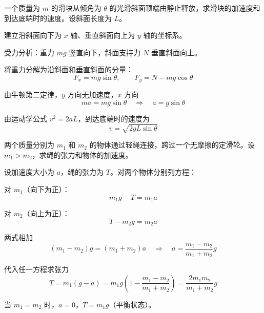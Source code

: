 \begin{example}[斜面上的滑块]
    一个质量为 $m$ 的滑块从倾角为 $\theta$ 的光滑斜面顶端由静止释放，求滑块的加速度和到达底端时的速度。设斜面长度为 $L$。
    \begin{solution}
        建立沿斜面向下为 $x$ 轴、垂直斜面向上为 $y$ 轴的坐标系。
        
        受力分析：重力 $mg$ 竖直向下，斜面支持力 $N$ 垂直斜面向上。
        
        将重力分解为沿斜面和垂直斜面的分量：
        \begin{equation}
            F_x = mg\sin\theta, \qquad F_y = N - mg\cos\theta
        \end{equation}
        
        由牛顿第二定律，$y$ 方向无加速度，$x$ 方向
        \begin{equation}
            ma = mg\sin\theta \quad \Longrightarrow \quad a = g\sin\theta
        \end{equation}
        
        由运动学公式 $v^2 = 2aL$，到达底端时的速度为
        \begin{equation}
            v = \sqrt{2gL\sin\theta}
        \end{equation}
    \end{solution}
\end{example}

\begin{example}[连接体问题]
    两个质量分别为 $m_1$ 和 $m_2$ 的物体通过轻绳连接，跨过一个无摩擦的定滑轮。设 $m_1 > m_2$，求绳的张力和物体的加速度。
    \begin{solution}
        设加速度大小为 $a$，绳的张力为 $T$。对两个物体分别列方程：
        
        对 $m_1$（向下为正）：
        \begin{equation}
            m_1 g - T = m_1 a
        \end{equation}
        
        对 $m_2$（向上为正）：
        \begin{equation}
            T - m_2 g = m_2 a
        \end{equation}
        
        两式相加
        \begin{equation}
            (m_1 - m_2)g = (m_1 + m_2)a \quad \Longrightarrow \quad a = \frac{m_1 - m_2}{m_1 + m_2}g
        \end{equation}
        
        代入任一方程求张力
        \begin{equation}
            T = m_1(g - a) = m_1 g\left(1 - \frac{m_1 - m_2}{m_1 + m_2}\right) = \frac{2m_1 m_2}{m_1 + m_2}g
        \end{equation}
        
        当 $m_1 = m_2$ 时，$a = 0$，$T = m_1 g$（平衡状态）。
    \end{solution}
\end{example}

